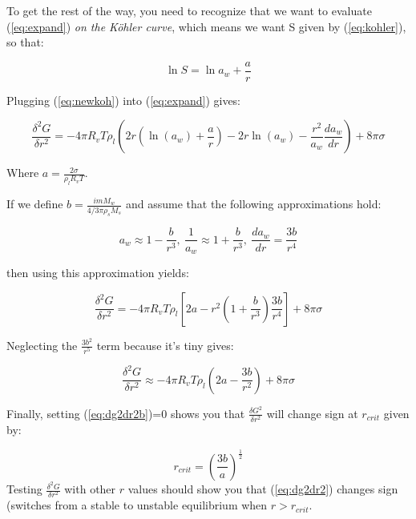 \documentclass[12pt]{article}
\begin{document}
To get the rest of the way, you need to recognize that we want to
evaluate (\ref{eq:expand}) \textit{on the K\"ohler curve}, which means
we want S given by (\ref{eq:kohler}), so that:

\begin{equation}
  \label{eq:newkoh}
  \ln S = \ln a_w + \frac{a}{r}
\end{equation}

Plugging (\ref{eq:newkoh}) into (\ref{eq:expand}) gives:


\begin{equation}
  \label{eq:dg2dr2}
\frac{\delta ^2 G}{\delta r^2} = -4 \pi R_v T \rho_l \left ( 2 r \left ( \ln(a_w)
    + \frac{a}{r} \right ) -2 r \ln (a_w ) - \frac{r^2}{a_w}
  \frac{da_w}{dr} \right ) + 8 \pi \sigma
\end{equation}

\noindent
Where $a=\frac{2 \sigma}{\rho_l R_v T}$.


If we define   $b= \frac{i m M_w}{ 4/3\pi \rho_s M_s}$
and assume that the following approximations hold:

\begin{equation}
  \label{eq:approx}
  a_w \approx 1 - \frac{b}{r^3},\  \frac{1}{a_w} \approx 1 +
  \frac{b}{r^3},\  \frac{da_w}{dr}=\frac{3b}{r^4}
\end{equation}

\noindent
then using this approximation yields:

\begin{equation}
  \label{eq:dg2dr2c}
  \frac{\delta ^2G}{\delta r^2} = - 4 \pi R_v T \rho_l \left [ 2 a - r^2 \left ( 1 +
    \frac{b}{r^3} \right ) \frac{3b}{r^4}  \right ] + 8 \pi \sigma
\end{equation}

Neglecting the $\frac{3 b^2}{r^5}$ term because it's tiny gives:




\begin{equation}
  \label{eq:dg2dr2b}
  \frac{\delta ^2 G}{\delta r^2} \approx -4 \pi R_v T \rho_l \left ( 2a -
    \frac{3b}{r^2} \right ) + 8 \pi \sigma
\end{equation}

Finally, setting (\ref{eq:dg2dr2b})=0 
shows you that $\frac{\delta G^2}{\delta r^2}$ will change sign at $r_{crit}$ 
given by: 


\begin{equation}
  \label{eq:rcrit}
  r_{crit}  = \left ( \frac{3b}{a} \right )^\frac{1}{2}
\end{equation}
Testing $\frac{\delta ^2 G}{\delta r^2}$ with other $r$ values should show you that
(\ref{eq:dg2dr2}) changes sign (switches from a stable to unstable
equilibrium when $r > r_{crit}$.
\end{document}
